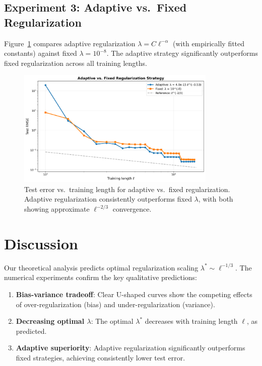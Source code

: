 \documentclass[11pt]{article}
\theoremstyle{definition}
\theoremstyle{remark}
\begin{document}
\subsection{Experiment 3: Adaptive vs.\ Fixed Regularization}

Figure~\ref{fig:exp3} compares adaptive regularization $\lambda = C \ell^{-\alpha}$ (with empirically fitted constants) against fixed $\lambda = 10^{-8}$. The adaptive strategy significantly outperforms fixed regularization across all training lengths.

\begin{figure}[h]
\centering
\includegraphics[width=0.85\textwidth]{experiment3_adaptive_vs_fixed.png}
\caption{Test error vs.\ training length for adaptive vs.\ fixed regularization. Adaptive regularization consistently outperforms fixed $\lambda$, with both showing approximate $\ell^{-2/3}$ convergence.}
\label{fig:exp3}
\end{figure}

\section{Discussion}

Our theoretical analysis predicts optimal regularization scaling $\lambda^* \sim \ell^{-1/3}$. The numerical experiments confirm the key qualitative predictions:

\begin{enumerate}
\item \textbf{Bias-variance tradeoff}: Clear U-shaped curves show the competing effects of over-regularization (bias) and under-regularization (variance).

\item \textbf{Decreasing optimal $\lambda$}: The optimal $\lambda^*$ decreases with training length $\ell$, as predicted.

\item \textbf{Adaptive superiority}: Adaptive regularization significantly outperforms fixed strategies, achieving consistently lower test error.
\end{enumerate}
\end{document}
